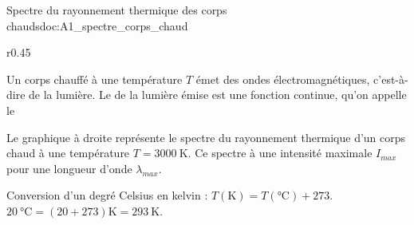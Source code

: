 

\newpage
\vspace*{-36pt}
\begin{doc}{Spectre du rayonnement thermique des corps chauds}{doc:A1_spectre_corps_chaud}
  \begin{wrapfigure}[5]{r}{0.45\linewidth}
    \vspace*{-20pt}
    \centering
  \end{wrapfigure}
  \strut\vspace*{-22pt}
  
  \begin{importants}  
    Un corps chauffé à une température $T$ émet des ondes électromagnétiques, c'est-à-dire de la lumière.
    Le  de la lumière émise est une fonction continue, qu'on appelle le 
  \end{importants}

  Le graphique à droite représente le spectre du rayonnement thermique d'un corps chaud à une température $T = \qty{3000}{\kelvin}$.
  Ce spectre à une intensité maximale $I_{max}$ pour une longueur d'onde $\lambda_{max}$.
  \medskip

  \begin{importants}
    Conversion d'un degré Celsius en kelvin :
    $T(\unit{\kelvin}) = T(\unit{\degreeCelsius}) + 273$. 
    \exemple $\qty{20}{\degreeCelsius} = (20 + 273) \unit{\kelvin} = \qty{293}{\kelvin}$.
  \end{importants}
\end{doc}



